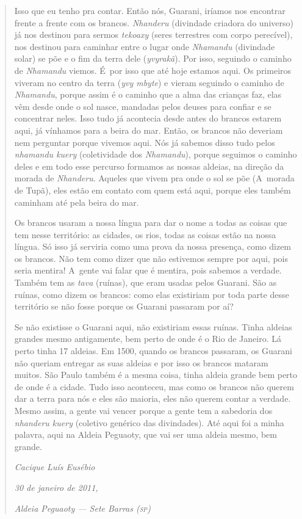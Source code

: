 \begin{quote}
\noindent
Isso que eu tenho pra contar. Então nós, Guarani, iríamos nos encontrar
frente a frente com os brancos. \emph{Nhanderu} (divindade criadora do
universo) já nos destinou para sermos \emph{tekoaxy} (seres terrestres com
corpo perecível), nos destinou para caminhar entre o lugar onde
\emph{Nhamandu} (divindade solar) se põe e o fim da terra dele
(\emph{yvyrakã}). Por isso, seguindo o caminho de \emph{Nhamandu} viemos. É~por isso
que até hoje estamos aqui. Os primeiros viveram no centro da terra (\emph{yvy
mbyte}) e vieram seguindo o caminho de \emph{Nhamandu}, porque assim é o caminho
que a alma das crianças faz, elas vêm desde onde o sol nasce, mandadas
pelos deuses para confiar e se concentrar neles. Isso tudo já acontecia
desde antes do brancos estarem aqui, já vínhamos para a beira do mar.
Então, os brancos não deveriam nem perguntar porque vivemos aqui. Nós
já sabemos disso tudo pelos \emph{nhamandu kuery} (coletividade dos \emph{Nhamandu}),
porque seguimos o caminho deles e em todo esse percurso formamos as
nossas aldeias, na direção da morada de \emph{Nhanderu}. Aqueles que vivem pra
onde o sol se põe (A~morada de Tupã), eles estão em contato com
quem está aqui, porque eles também caminham até pela beira do mar. 

\noindent
Os brancos usaram a nossa língua para dar o nome a todas as coisas que
tem nesse território: as cidades, os rios, todas as coisas estão na
nossa língua. Só isso já serviria como uma prova da nossa presença,
como dizem os brancos. Não tem como dizer que não estivemos sempre por
aqui, pois seria mentira! A~gente vai falar que é mentira, pois sabemos a
verdade. Também tem as \emph{tava} (ruínas), que eram usadas pelos Guarani.
São as ruínas, como dizem os brancos: como elas existiriam por toda
parte desse território se não fosse porque os Guarani passaram por aí? 

\noindent
Se não existisse o Guarani aqui, não existiriam essas ruínas. Tinha
aldeias grandes mesmo antigamente, bem perto de onde é o Rio de
Janeiro. Lá perto tinha 17 aldeias. Em 1500, quando os brancos
passaram, os Guarani não queriam entregar as suas aldeias e por isso os
brancos mataram muitos. São Paulo também é a mesma coisa, tinha aldeia
grande bem perto de onde é a cidade. Tudo isso aconteceu, mas como os
brancos não querem dar a terra para nós e eles são maioria, eles não
querem contar a verdade. Mesmo assim, a gente vai vencer porque a gente
tem a sabedoria dos \emph{nhanderu kuery} (coletivo genérico das divindades).
Até aqui foi a minha palavra, aqui na Aldeia Peguaoty, que vai ser uma
aldeia mesmo, bem grande.
\medskip
\begin{flushright}
\emph{Cacique Luís Eusébio}

\emph{30 de janeiro de 2011,}

\emph{Aldeia Peguaoty --- Sete Barras (\textsc{sp})}

\end{flushright}
\end{quote}

